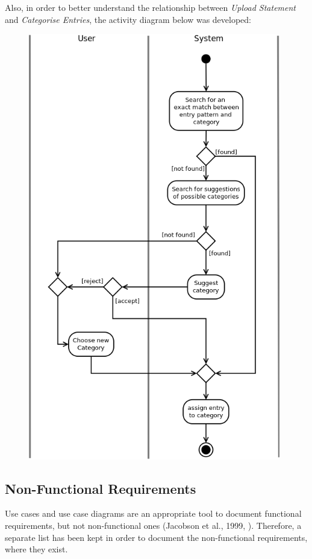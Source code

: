 Also, in order to better understand the relationship between \emph{Upload
Statement} and \emph{Categorise Entries}, the activity diagram below was
developed:
\begin{figure}[ht!]
  \begin{center}
    \includegraphics[width=11cm]{./contents/img/Activity_Diagram_-_Categorise_Entries.png}
  \end{center}
\end{figure}
\FloatBarrier


\subsection{Non-Functional Requirements} \label{sec:Requirements.NonFunctionalRequirements}
Use cases and use case diagrams are an appropriate tool to document functional
requirements, but not non-functional ones (Jacobson et al., 1999,
\cite[cited][p.~153]{bennett2010object}). Therefore, a separate list has been
kept in order to document the non-functional requirements, where they exist.
